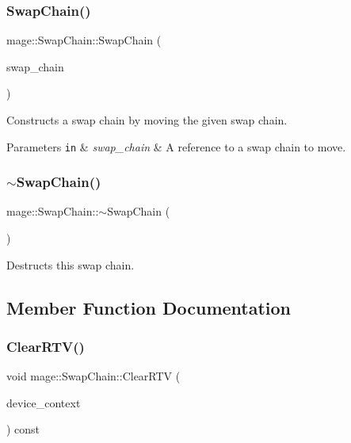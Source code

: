 \subsubsection{\texorpdfstring{Swap\+Chain()}{SwapChain()}\hspace{0.1cm}{\footnotesize\ttfamily [3/3]}}
{\footnotesize\ttfamily mage\+::\+Swap\+Chain\+::\+Swap\+Chain (\begin{DoxyParamCaption}\item[{\hyperlink{classmage_1_1_swap_chain}{Swap\+Chain} \&\&}]{swap\+\_\+chain }\end{DoxyParamCaption})\hspace{0.3cm}{\ttfamily [default]}}

Constructs a swap chain by moving the given swap chain.


\begin{DoxyParams}[1]{Parameters}
\mbox{\tt in}  & {\em swap\+\_\+chain} & A reference to a swap chain to move. \\
\hline
\end{DoxyParams}
\hypertarget{classmage_1_1_swap_chain_a853168cba69cadc3d8c10ad2f4939e72}{}\label{classmage_1_1_swap_chain_a853168cba69cadc3d8c10ad2f4939e72} 
\subsubsection{\texorpdfstring{$\sim$\+Swap\+Chain()}{~SwapChain()}}
{\footnotesize\ttfamily mage\+::\+Swap\+Chain\+::$\sim$\+Swap\+Chain (\begin{DoxyParamCaption}{ }\end{DoxyParamCaption})}

Destructs this swap chain. 

\subsection{Member Function Documentation}
\hypertarget{classmage_1_1_swap_chain_a3e78e19609d97b9e599f49d7e79e24af}{}\label{classmage_1_1_swap_chain_a3e78e19609d97b9e599f49d7e79e24af} 
\subsubsection{\texorpdfstring{Clear\+R\+T\+V()}{ClearRTV()}}
{\footnotesize\ttfamily void mage\+::\+Swap\+Chain\+::\+Clear\+R\+TV (\begin{DoxyParamCaption}\item[{I\+D3\+D11\+Device\+Context2 $\ast$}]{device\+\_\+context }\end{DoxyParamCaption}) const\hspace{0.3cm}{\ttfamily [noexcept]}}

